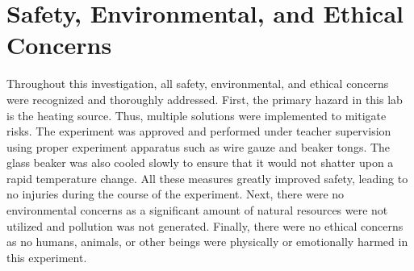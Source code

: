 \section{Safety, Environmental, and Ethical Concerns}
Throughout this investigation, all safety, environmental, and ethical concerns were recognized and thoroughly addressed. First, the primary hazard in this lab is the heating source. Thus, multiple solutions were implemented to mitigate risks. The experiment was approved and performed under teacher supervision using proper experiment apparatus such as wire gauze and beaker tongs. The glass beaker was also cooled slowly to ensure that it would not shatter upon a rapid temperature change. All these measures greatly improved safety, leading to no injuries during the course of the experiment. Next, there were no environmental concerns as a significant amount of natural resources were not utilized and pollution was not generated. Finally, there were no ethical concerns as no humans, animals, or other beings were physically or emotionally harmed in this experiment.